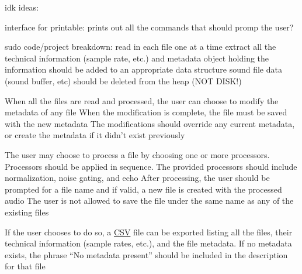 idk ideas\+:
\begin{DoxyItemize}
\item interface for printable\+: prints out all the commands that should promp the user? 

 sudo code/project breakdown\+: read in each file one at a time extract all the technical information (sample rate, etc.) and metadata object holding the information should be added to an appropriate data structure sound file data (sound buffer, etc) should be deleted from the heap (N\+OT D\+I\+S\+K!)

When all the files are read and processed, the user can choose to modify the metadata of any file When the modification is complete, the file must be saved with the new metadata The modifications should override any current metadata, or create the metadata if it didn’t exist previously

The user may choose to process a file by choosing one or more processors. Processors should be applied in sequence. The provided processors should include normalization, noise gating, and echo After processing, the user should be prompted for a file name and if valid, a new file is created with the processed audio The user is not allowed to save the file under the same name as any of the existing files

If the user chooses to do so, a \hyperlink{classCSV}{C\+SV} file can be exported listing all the files, their technical information (sample rates, etc.), and the file metadata. If no metadata exists, the phrase “\+No metadata present” should be included in the description for that file 
\end{DoxyItemize}